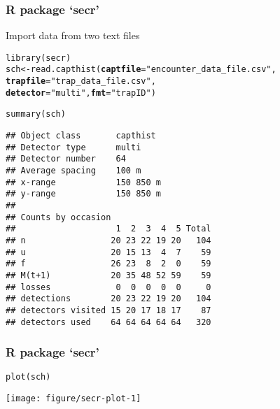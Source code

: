 \documentclass[color=usenames,dvipsnames]{beamer}\usepackage[]{graphicx}\usepackage[]{color}
\makeatletter
\newcommand{\hlstr}[1]{\textcolor[rgb]{0.749,0.012,0.012}{#1}}%
\newcommand{\hlstd}[1]{\textcolor[rgb]{0,0,0}{#1}}%
\newcommand{\hlkwb}[1]{\textcolor[rgb]{0,0.341,0.682}{#1}}%
\newcommand{\hlkwc}[1]{\textcolor[rgb]{0,0,0}{\textbf{#1}}}%
\newcommand{\hlkwd}[1]{\textcolor[rgb]{0.004,0.004,0.506}{#1}}%
\newenvironment{kframe}{%
 \def\at@end@of@kframe{}%
 \ifinner\ifhmode%
  \def\at@end@of@kframe{\end{minipage}}%
  \begin{minipage}{\columnwidth}%
 \fi\fi%
 \def\FrameCommand##1{\hskip\@totalleftmargin \hskip-\fboxsep
 \colorbox{shadecolor}{##1}\hskip-\fboxsep
     \hskip-\linewidth \hskip-\@totalleftmargin \hskip\columnwidth}%
 \MakeFramed {\advance\hsize-\width
   \@totalleftmargin\z@ \linewidth\hsize
   \@setminipage}}%
 {\par\unskip\endMakeFramed%
 \at@end@of@kframe}
\newenvironment{knitrout}{}{} %
\makeatother
\begin{document}
\begin{frame}[fragile]
  \frametitle{R package `secr'}
  Import data from two text files
\begin{knitrout}\tiny
{}\color{fgcolor}\begin{kframe}
\begin{alltt}
\hlkwd{library}\hlstd{(secr)}
\hlstd{sch} \hlkwb{<-} \hlkwd{read.capthist}\hlstd{(}\hlkwc{captfile}\hlstd{=}\hlstr{"encounter_data_file.csv"}\hlstd{,}
                     \hlkwc{trapfile}\hlstd{=}\hlstr{"trap_data_file.csv"}\hlstd{,}
                     \hlkwc{detector}\hlstd{=}\hlstr{"multi"}\hlstd{,} \hlkwc{fmt}\hlstd{=}\hlstr{"trapID"}\hlstd{)}
\end{alltt}


{\ttfamily\noindent\itshape\color{messagecolor}{\#\# No errors found :-)}}\begin{alltt}
\hlkwd{summary}\hlstd{(sch)}
\end{alltt}
\begin{verbatim}
## Object class       capthist 
## Detector type      multi 
## Detector number    64 
## Average spacing    100 m 
## x-range            150 850 m 
## y-range            150 850 m 
## 
## Counts by occasion 
##                    1  2  3  4  5 Total
## n                 20 23 22 19 20   104
## u                 20 15 13  4  7    59
## f                 26 23  8  2  0    59
## M(t+1)            20 35 48 52 59    59
## losses             0  0  0  0  0     0
## detections        20 23 22 19 20   104
## detectors visited 15 20 17 18 17    87
## detectors used    64 64 64 64 64   320
\end{verbatim}
\end{kframe}
\end{knitrout}
\end{frame}



\begin{frame}[fragile]
  \frametitle{R package `secr'}
\begin{knitrout}
\color{fgcolor}\begin{kframe}
\begin{alltt}
\hlkwd{plot}\hlstd{(sch)}
\end{alltt}
\end{kframe}

{\centering \texttt{[image: figure/secr-plot-1]} 

}



\end{knitrout}
\end{frame}
\end{document}
